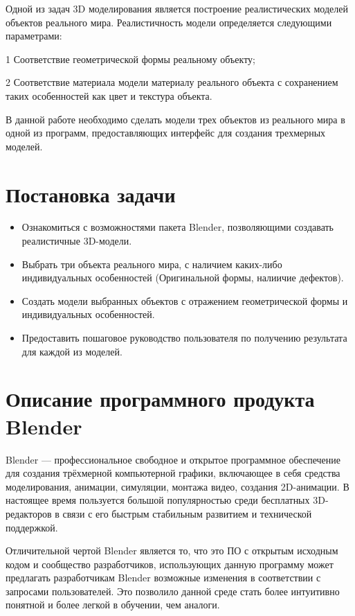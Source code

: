\documentclass[12pt]{article}
\begin{document}
Одной из задач 3D моделирования является построение реалистических моделей объектов
реального мира. Реалистичность модели определяется следующими параметрами:

1 Соответствие геометрической формы реальному объекту;

2 Соответствие материала модели материалу реального объекта с сохранением таких особенностей как цвет и текстура объекта.

В данной работе необходимо сделать модели трех объектов из реального мира в одной из программ, предоставляющих интерфейс для создания трехмерных моделей.




\newpage

\section{Постановка задачи}

\begin{itemize}
\item Ознакомиться с возможностями пакета Blender, позволяющими создавать реалистичные 3D-модели.

\item Выбрать три объекта реального мира, с наличием каких-либо индивидуальных особенностей (Оригинальной формы, налиичие дефектов).

\item Создать модели выбранных объектов с отражением геометрической формы и индивидуальных особенностей.

\item Предоставить пошаговое руководство пользователя по получению результата для каждой из моделей.
\end{itemize}

\newpage


\section{Описание программного продукта Blender}


Blender — профессиональное свободное и открытое программное обеспечение для создания трёхмерной компьютерной графики, включающее в себя средства моделирования, анимации, симуляции, монтажа видео, создания 2D-анимации. В настоящее время пользуется большой популярностью среди бесплатных 3D-редакторов в связи с его быстрым стабильным развитием и технической поддержкой.

Отличительной чертой Blender является то, что это ПО с открытым исходным кодом и сообщество разработчиков, использующих данную программу может предлагать разработчикам Blender возможные изменения в соответствии с запросами пользователей. Это позволило данной среде стать более интуитивно понятной и более легкой в обучении, чем аналоги.
\end{document}
